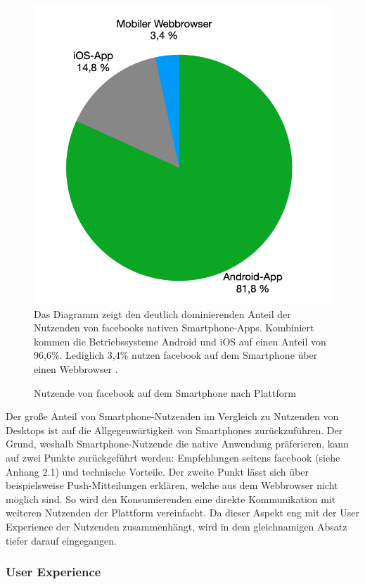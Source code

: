 \documentclass[a4paper]{scrartcl}
\begin{document}
\begin{figure}[H]
	\centering
	\caption{Nutzende von facebook auf dem Smartphone nach Plattform}
	\includegraphics[scale=0.3]{_assets/facebook_mobile_users.png} \\
	Das Diagramm zeigt den deutlich dominierenden Anteil der Nutzenden von facebooks nativen Smartphone-Apps. Kombiniert kommen die Betriebssysteme Android und iOS auf einen Anteil von 96,6\%. Lediglich 3,4\% nutzen facebook auf dem Smartphone über einen Webbrowser \autocite{Kemp_Facebook}.
\end{figure}

Der große Anteil von Smartphone-Nutzenden im Vergleich zu Nutzenden von Desktops ist auf die Allgegenwärtigkeit von Smartphones zurückzuführen. Der Grund, weshalb Smartphone-Nutzende die native Anwendung präferieren, kann auf zwei Punkte zurückgeführt werden: Empfehlungen seitens facebook (siehe Anhang 2.1) und technische Vorteile. Der zweite Punkt lässt sich über beispielsweise Push-Mitteilungen erklären, welche aus dem Webbrowser nicht möglich sind. So wird den Konsumierenden eine direkte Kommunikation mit weiteren Nutzenden der Plattform vereinfacht. Da dieser Aspekt eng mit der User Experience der Nutzenden zusammenhängt, wird in dem gleichnamigen Absatz tiefer darauf eingegangen.

\subsubsection{User Experience}
\end{document}
